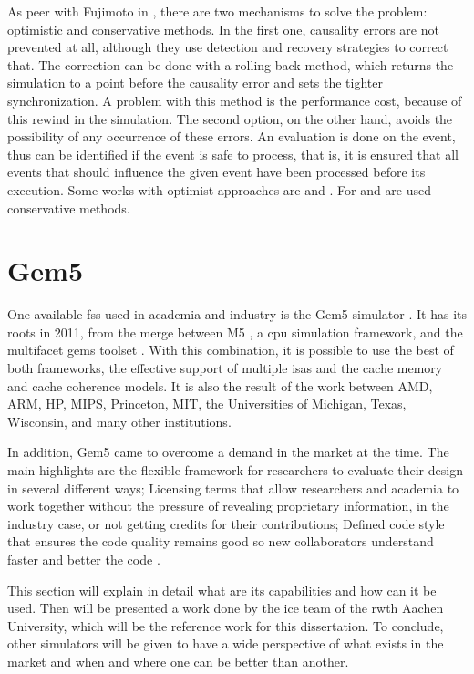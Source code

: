As peer with Fujimoto in \cite{PDESfujimoto}, there are two mechanisms to solve the problem: optimistic and conservative methods. In the 
first one, causality errors are not prevented at all, although they use detection and recovery strategies to correct that. The correction can 
be done with a rolling back method, which returns the simulation to a point before the causality error and sets the tighter synchronization. 
A problem with this method is the performance cost, because of this rewind in the simulation. The second option, on the other hand, avoids the 
possibility of any occurrence of these errors. An evaluation is done on the event, thus can be identified if the event is safe to process, that 
is, it is ensured that all events that should influence the given event have been processed before its execution. Some works with optimist 
approaches are \cite{busnot2020standard} and \cite{optimist2}. For \cite{dist-gem5} and \cite{asynchronousSimulator} are used conservative methods.

\section{Gem5}

One available \gls{fss} used in academia and industry is the Gem5 simulator \cite{TheGem5Simulator}\cite{Thegem5simulatorV2}. It has its roots 
in 2011, from the merge between M5 \cite{TheM5Simulator}, a \gls{cpu} simulation framework, and the multifacet \gls{gems} toolset \cite{TheGEMS}. 
With this combination, it is possible to use the best of both frameworks, the effective support of multiple \glspl{isa} and the cache memory 
and cache coherence models. It is also the result of the work between AMD, ARM, HP, MIPS, Princeton, MIT, the Universities of Michigan, Texas, 
Wisconsin, and many other institutions.

In addition, Gem5 came to overcome a demand in the market at the time. The main highlights are the flexible framework for researchers to 
evaluate their design in several different ways; Licensing terms that allow researchers and academia to work together without the pressure 
of revealing proprietary information, in the industry case, or not getting credits for their contributions; Defined code style that ensures 
the code quality remains good so new collaborators understand faster and better the code \cite{TheGem5Simulator}. 

This section will explain in detail what are its capabilities and how can it be used. Then will be presented a work done by the \gls{ice} team 
of the \gls{rwth} Aachen University, which will be the reference work for this dissertation. To conclude, other simulators will be given to 
have a wide perspective of what exists in the market and when and where one can be better than another. 


